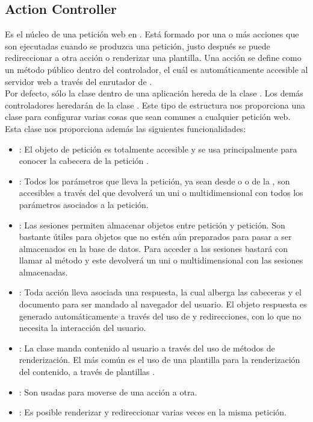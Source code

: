 \subsection{Action Controller}
Es el núcleo de una petición web en . Está formado por
una o más acciones que son ejecutadas cuando se produzca una petición, justo
después se puede redireccionar a otra acción o renderizar una plantilla. Una
acción se define como un método público dentro del controlador, el cuál es
automáticamente accesible al servidor web a través del enrutador de
.\\

Por defecto, sólo la clase  dentro de una
aplicación  hereda de la clase
. Los demás controladores heredarán de la clase
. Este tipo de estructura nos proporciona una
clase para configurar varias cosas que sean comunes a cualquier petición web.\\

Esta clase nos proporciona además las siguientes funcionalidades:

\begin{itemize}
\item {}: El objeto de petición es totalmente accesible y se
  usa principalmente para conocer la cabecera de la petición .
\item {}: Todos los parámetros que lleva la petición, ya sean
  desde  o  o de la , son accesibles a
  través del   que devolverá un 
  uni o multidimensional con todos los parámetros asociados a la petición.
\item {}: Las sesiones permiten almacenar objetos entre petición
  y petición. Son bastante útiles para objetos que no estén aún preparados para
  pasar a ser almacenados en la base de datos. Para acceder a las sesiones
  bastará con llamar al método  y este devolverá un
   uni o multidimensional con las sesiones almacenadas.
\item {}: Toda acción lleva asociada una respuesta, la cual
  alberga las cabeceras y el documento para ser mandado al navegador del
  usuario. El objeto respuesta es generado automáticamente a través del uso de
   y redirecciones, con lo que no necesita la interacción del
  usuario.
\item {}: La clase  manda
  contenido al usuario a través del uso de métodos de renderización. El más
  común es el uso de una plantilla para la renderización del contenido, a través
  de plantillas .
\item {}: Son usadas para moverse de una acción a otra.
\item {}: Es posible renderizar
  y redireccionar varias veces en la misma petición.
\end{itemize}

